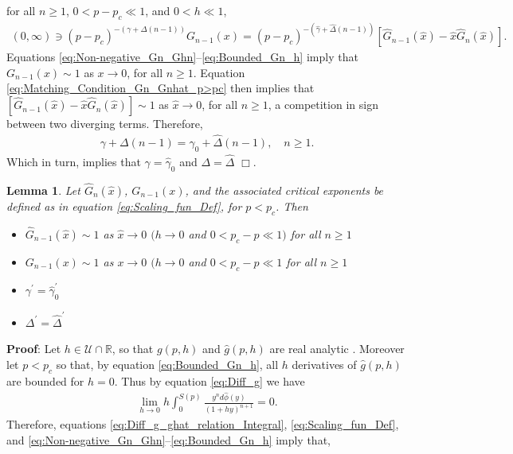 \documentclass[english,12pt,jmp,graphicx]{revtex4-1}
\newtheorem{lemma}{Lemma}[section]
\newcommand{\ph}{\hat{\phi}}
\newcommand{\gh}{\hat{\gamma}}
\newcommand{\Dh}{\hat{\Delta}}
\newcommand{\xh}{\hat{x}}
\begin{document}
for all $n\geq1$, $0<p-p_c\ll1$, and $0<h\ll1$,   
%
\begin{align}\label{eq:Matching_Condition_Gn_Gnhat_p>pc}
  (0,\infty)\ni(p-p_c)^{-(\gamma+\Delta(n-1))}G_{n-1}(x)
       =(p-p_c)^{-(\gh+\Dh(n-1))}[\hat{G}_{n-1}(\xh)-\xh\hat{G}_n(\xh)].
\end{align}
%
Equations \eqref{eq:Non-negative_Gn_Ghn}--\eqref{eq:Bounded_Gn_h}
imply that $G_{n-1}(x)\sim1$ as $x\to0$, for all $n\geq1$. Equation
\eqref{eq:Matching_Condition_Gn_Gnhat_p>pc} then implies that 
$[\hat{G}_{n-1}(\xh)-\xh\hat{G}_n(\xh)]\sim1$ as $\xh\to0$,
for all $n\geq1$, a competition in sign between two diverging
terms. %
Therefore, 
%
\begin{align}
  \gamma+\Delta(n-1)=\gh_0+\Dh(n-1), \quad n\geq1.
\end{align}
%
Which in turn, implies that $\gamma=\gh_0$ and $\Delta=\Dh$ $\Box$.
%
%
 \begin{lemma}\label{lem:asymp_Scaling_funs_x_to_0_p<pc}
   Let $\hat{G}_n(\xh)$, $G_{n-1}(x)$, and the associated critical
   exponents be defined as in equation \eqref{eq:Scaling_fun_Def}, for
   $p<p_c$. Then
     \begin{itemize}
    \item[1)] $\hat{G}_{n-1}(\xh)\sim1$ as $\xh\to0$ $(h\to0$ and $0<p_c-p\ll1)$
      for all $n\geq1$ 
    \item[2)] $G_{n-1}(x)\sim1$ as $x\to0$ $(h\to0$ and $0<p_c-p\ll1$ for all $n\geq1$
    \item[3)] $\gamma^\prime=\gh_0^\prime$  
    \item[4)] $\Delta^\prime=\Dh^\prime$    
     \end{itemize}
 \end{lemma}
%
\noindent \textbf{Proof}:
%
Let $h\in\mathcal{U}\cap\mathbb{R}$, so that $g(p,h)$ and $\hat{g}(p,h)$ are
real analytic \cite{Golden:CMP-473}. Moreover let $p<p_c$ so that, by
equation \eqref{eq:Bounded_Gn_h}, all $h$ derivatives of
$\hat{g}(p,h)$ are bounded for $h=0$. Thus by equation
\eqref{eq:Diff_g} we have   
%
\begin{align*}
  \lim_{h\to0}h \int_0^{S(p)}\frac{y^nd\ph(y)}{(1+hy)^{n+1}}=0.
\end{align*}
%
Therefore, equations \eqref{eq:Diff_g_ghat_relation_Integral}, 
\eqref{eq:Scaling_fun_Def}, and
\eqref{eq:Non-negative_Gn_Ghn}--\eqref{eq:Bounded_Gn_h} imply that,
\end{document}
